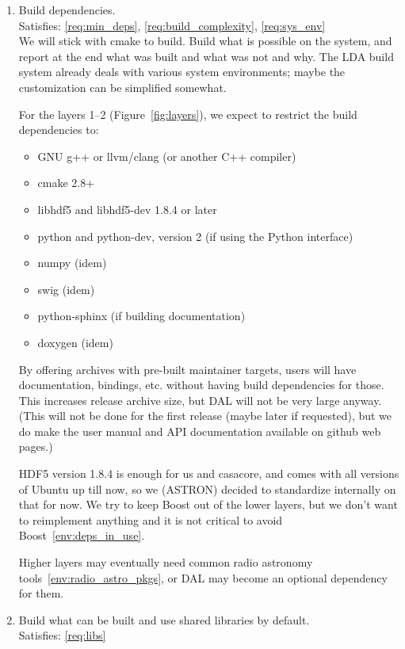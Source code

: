 \documentclass[a4paper,11pt]{article}
\begin{document}
\begin{enumerate}[resume, label=\it D.\arabic{*}]
\itemsep0em

\item \label{dsg:min_deps} Build dependencies.\\
Satisfies: \ref{req:min_deps}, \ref{req:build_complexity}, \ref{req:sys_env}\\

We will stick with cmake to build.
Build what is possible on the system, and report at the end what was built and what was not and why.
The LDA build system already deals with various system environments; maybe the customization can be simplified somewhat.

For the layers 1--2 (Figure~\ref{fig:layers}), we expect to restrict the build dependencies to:
\begin{itemize}
\itemsep0em
\item GNU g++ or llvm/clang (or another C++ compiler)
\item cmake 2.8+
\item libhdf5 and libhdf5-dev 1.8.4 or later

\item python and python-dev, version 2 (if using the Python interface)
\item numpy (idem)
\item swig (idem)
\item python-sphinx (if building documentation)
\item doxygen (idem)
\end{itemize}
By offering archives with pre-built maintainer targets, users will have documentation, bindings, etc. without having build dependencies for those.
This increases release archive size, but DAL will not be very large anyway.
(This will not be done for the first release (maybe later if requested), but we do make the user manual and API documentation available on github web pages.)

HDF5 version 1.8.4 is enough for us and casacore, and comes with all versions of Ubuntu up till now, so we (ASTRON) decided to standardize internally on that for now.
We try to keep Boost out of the lower layers, but we don't want to reimplement anything and it is not critical to avoid Boost~\ref{env:deps_in_use}.

Higher layers may eventually need common radio astronomy tools~\ref{env:radio_astro_pkgs}, or DAL may become an optional dependency for them.


\item \label{dsg:libs} Build what can be built and use shared libraries by default.\\
Satisfies: \ref{req:libs}


\end{enumerate}
\end{document}
